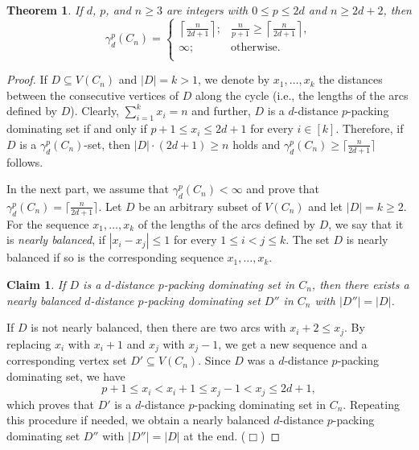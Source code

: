 \documentclass[12pt]{article}
\newtheorem{theorem}{Theorem}[section]
\newtheorem{claim}{Claim}
\newcommand{\smallqed}{{\tiny ($\Box$)}}
\begin{document}
\begin{theorem} \label{thm:cycles}
If $d$, $p$, and $n\ge 3$ are integers with  $0 \leq p \leq 2d$ and $n \ge 2d+2$, then 
 $$
    \gamma_d^p(C_n)=
    \begin{cases}
		\left\lceil\frac{n}{2d+1}\right\rceil; & \frac{n}{p+1} \ge \left\lceil\frac{n}{2d+1} \right\rceil,\\
        	\infty; & \mbox{otherwise}.\\
    \end{cases}
    $$    
\end{theorem}
\begin{proof} If $D \subseteq V(C_n)$ and $|D|=k >1$, we denote by $x_1, \dots, x_k$ the distances between the consecutive vertices of $D$ along the cycle (i.e., the lengths of the arcs defined by $D$). Clearly, $\sum_{i=1}^k x_i=n$ and further, $D$ is a $d$-distance $p$-packing dominating set if and only if $p+1 \le x_i \le 2d+1$  for every $i \in [k]$. Therefore, if $D$ is a $\gamma_d^p(C_n)$-set, then $|D|\cdot (2d+1) \ge n$ holds and $\gamma_d^p(C_n) \ge \lceil\frac{n}{2d+1}\rceil$ follows.
\medskip

In the next part, we assume that $\gamma_d^p(C_n) <\infty$ and prove that $\gamma_d^p(C_n) = \lceil\frac{n}{2d+1}\rceil$. Let $D$ be an arbitrary subset of $V(C_n)$ and let $|D|=k \ge 2$. For the sequence $x_1, \dots, x_k$ of the lengths of the arcs defined by $D$, we say that it is \emph{nearly balanced}, if $|x_i -x_j| \leq 1$ for every $1 \leq i <j \leq k$. The set $D$ is nearly balanced if so is the corresponding sequence $x_1, \dots, x_k$.
\begin{claim} \label{claim:cycles-1}
If $D$ is a $d$-distance $p$-packing dominating set in $C_n$, then there exists a nearly balanced $d$-distance $p$-packing dominating set $D''$ in $C_n$ with $|D''|=|D|$.    
\end{claim}
\proof If $D$ is not nearly balanced, then there are two arcs with $x_i +2 \leq x_j$. By replacing $x_i$ with $x_i+1$ and $x_j$ with $x_j-1$, we get a new sequence and a corresponding vertex set $D' \subseteq V(C_n)$. Since $D$ was a $d$-distance $p$-packing dominating set, we have
$$
p+1 \le x_i <x_i +1 \le x_j-1 <x_j \le 2d+1,
$$
which proves that $D'$ is a $d$-distance $p$-packing dominating set in $C_n$. Repeating this procedure if needed, we obtain a nearly balanced $d$-distance $p$-packing dominating set $D''$ with $|D''|=|D|$ at the end. \smallqed


\end{proof}
\end{document}

